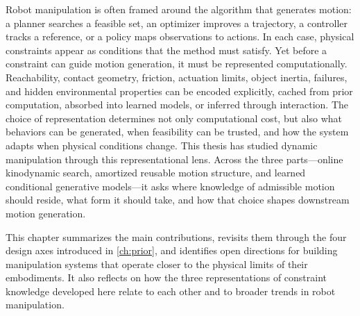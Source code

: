 Robot manipulation is often framed around the algorithm that generates motion: a planner searches a feasible set, an optimizer improves a trajectory, a controller tracks a reference, or a policy maps observations to actions. In each case, physical constraints appear as conditions that the method must satisfy. Yet before a constraint can guide motion generation, it must be represented computationally. Reachability, contact geometry, friction, actuation limits, object inertia, failures, and hidden environmental properties can be encoded explicitly, cached from prior computation, absorbed into learned models, or inferred through interaction. The choice of representation determines not only computational cost, but also what behaviors can be generated, when feasibility can be trusted, and how the system adapts when physical conditions change.
This thesis has studied dynamic manipulation through this representational lens. Across the three parts---online kinodynamic search, amortized reusable motion structure, and learned conditional generative models---it asks where knowledge of admissible motion should reside, what form it should take, and how that choice shapes downstream motion generation.



This chapter summarizes the main contributions, revisits them through the four design axes introduced in \cref{ch:prior}, and identifies open directions for building manipulation systems that operate closer to the physical limits of their embodiments.
It also reflects on how the three representations of constraint knowledge developed here relate to each other and to broader trends in robot manipulation.
